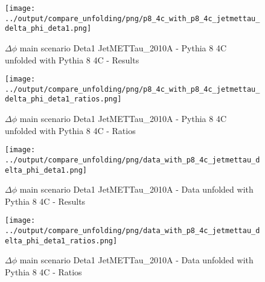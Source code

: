 \documentclass[11pt]{book}
\begin{document}
\begin{figure}[ht]
\centering
\texttt{[image: ../output/compare\_unfolding/png/p8\_4c\_with\_p8\_4c\_jetmettau\_delta\_phi\_deta1.png]}
\caption{$\Delta\phi$ main scenario Deta1 JetMETTau\_2010A - Pythia 8 4C unfolded with Pythia 8 4C - Results}
\label{p8_p8_jetmettau_delta_phi_deta1_a}
\end{figure}

\begin{figure}[ht]
\centering
\texttt{[image: ../output/compare\_unfolding/png/p8\_4c\_with\_p8\_4c\_jetmettau\_delta\_phi\_deta1\_ratios.png]}
\caption{$\Delta\phi$ main scenario Deta1 JetMETTau\_2010A - Pythia 8 4C unfolded with Pythia 8 4C - Ratios}
\label{p8_p8_jetmettau_delta_phi_deta1_b}
\end{figure}

\begin{comment}
\begin{figure}[ht]
\centering
\texttt{[image: ../output/compare\_unfolding/png/p6\_z2\_with\_p8\_4c\_jetmettau\_delta\_phi\_deta1.png]}
\caption{$\Delta\phi$ main scenario Deta1 JetMETTau\_2010A - Pythia 6 Z2* unfolded with Pythia 8 4C - Results}
\label{p6_p8_jetmettau_delta_phi_deta1_a}
\end{figure}

\begin{figure}[ht]
\centering
\texttt{[image: ../output/compare\_unfolding/png/p6\_z2\_with\_p8\_4c\_jetmettau\_delta\_phi\_deta1\_ratios.png]}
\caption{$\Delta\phi$ main scenario Deta1 JetMETTau\_2010A - Pythia 6 Z2* unfolded with Pythia 8 4C - Ratios}
\label{p6_p8_jetmettau_delta_phi_deta1_b}
\end{figure}
\end{comment}

\begin{figure}[ht]
\centering
\texttt{[image: ../output/compare\_unfolding/png/data\_with\_p8\_4c\_jetmettau\_delta\_phi\_deta1.png]}
\caption{$\Delta\phi$ main scenario Deta1 JetMETTau\_2010A - Data unfolded with Pythia 8 4C - Results}
\label{data_p8_jetmettau_delta_phi_deta1_a}
\end{figure}

\begin{figure}[ht]
\centering
\texttt{[image: ../output/compare\_unfolding/png/data\_with\_p8\_4c\_jetmettau\_delta\_phi\_deta1\_ratios.png]}
\caption{$\Delta\phi$ main scenario Deta1 JetMETTau\_2010A - Data unfolded with Pythia 8 4C - Ratios}
\label{data_p8_jetmettau_delta_phi_deta1_b}
\end{figure}
\end{document}
